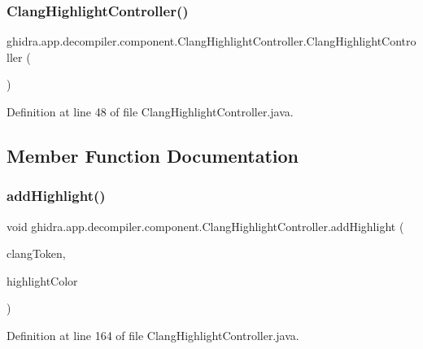 \subsubsection{\texorpdfstring{ClangHighlightController()}{ClangHighlightController()}}
{\footnotesize\ttfamily ghidra.\+app.\+decompiler.\+component.\+Clang\+Highlight\+Controller.\+Clang\+Highlight\+Controller (\begin{DoxyParamCaption}{ }\end{DoxyParamCaption})\hspace{0.3cm}{\ttfamily [inline]}}



Definition at line 48 of file Clang\+Highlight\+Controller.\+java.



\subsection{Member Function Documentation}
\mbox{\label{classghidra_1_1app_1_1decompiler_1_1component_1_1_clang_highlight_controller_a8a3fd199e6bb9bf1533edbeedfadc614}} 
\subsubsection{\texorpdfstring{addHighlight()}{addHighlight()}}
{\footnotesize\ttfamily void ghidra.\+app.\+decompiler.\+component.\+Clang\+Highlight\+Controller.\+add\+Highlight (\begin{DoxyParamCaption}\item[{\mbox{\hyperlink{classghidra_1_1app_1_1decompiler_1_1_clang_token}{Clang\+Token}}}]{clang\+Token,  }\item[{Color}]{highlight\+Color }\end{DoxyParamCaption})\hspace{0.3cm}{\ttfamily [inline]}}



Definition at line 164 of file Clang\+Highlight\+Controller.\+java.

